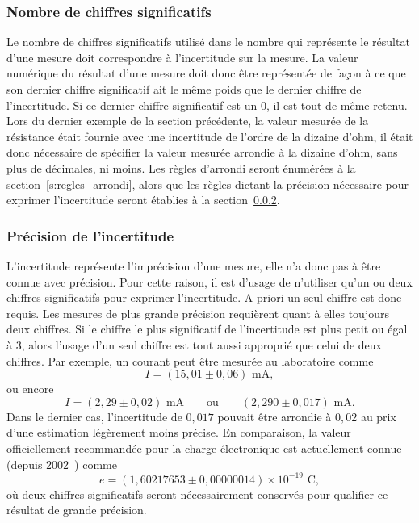 \subsubsection{Nombre de chiffres significatifs}
\label{s:nombre_chiffres_significatifs}

Le nombre de chiffres significatifs utilisé dans le nombre qui représente le résultat d'une mesure doit correspondre à l'incertitude sur la mesure. La valeur numérique du résultat d'une mesure doit donc être représentée de façon à ce que son dernier chiffre significatif ait le même poids que le dernier chiffre de l'incertitude. Si ce dernier chiffre significatif est un 0, il est tout de même retenu. Lors du dernier exemple de la section précédente, la valeur mesurée de la résistance était fournie avec une incertitude de l'ordre de la dizaine d'ohm, il était donc nécessaire de spécifier la valeur mesurée arrondie à la dizaine d'ohm, sans plus de décimales, ni moins. Les règles d'arrondi seront énumérées à la section~\ref{s:regles_arrondi}, alors que les règles dictant la précision nécessaire pour exprimer l'incertitude seront établies à la section~\ref{s:precision_incertitude}.


\subsubsection{Précision de l'incertitude}
\label{s:precision_incertitude}

L'incertitude représente l'imprécision d'une mesure, elle n'a donc pas à être connue avec précision. Pour cette raison, il est d'usage de n'utiliser qu'un ou deux chiffres significatifs pour exprimer l'incertitude. A priori un seul chiffre est donc requis. Les mesures de plus grande précision requièrent quant à elles toujours deux chiffres. Si le chiffre le plus significatif de l'incertitude est plus petit ou égal à 3, alors l'usage d'un seul chiffre est tout aussi approprié que celui de deux chiffres. Par exemple, un courant peut être mesurée au laboratoire comme
\begin{equation}
  I = \left( 15,01 \pm 0,06 \right) \mbox{~mA},
\end{equation}
ou encore
\begin{equation}
  I = \left( 2,29 \pm 0,02 \right) \mbox{~mA}
  \qquad
  \mbox{ou}
  \qquad
  \left( 2,290 \pm 0,017 \right) \mbox{~mA}.
\end{equation}
Dans le dernier cas, l'incertitude de $0,017$ pouvait être arrondie à $0,02$ au prix d'une estimation légèrement moins précise. En comparaison, la valeur officiellement recommandée pour la charge électronique est actuellement connue (depuis 2002~\cite{MOH02}) comme
\begin{equation}
  e = \left( 1,60217653 \pm 0,00000014 \right) \times 10^{-19} \mbox{~C},
\end{equation}
où deux chiffres significatifs seront nécessairement conservés pour qualifier ce résultat de grande précision.


